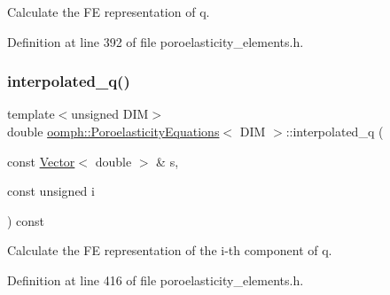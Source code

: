 Calculate the FE representation of q. 



Definition at line 392 of file poroelasticity\+\_\+elements.\+h.

\mbox{\label{classoomph_1_1PoroelasticityEquations_acc0ef084dfaa656827ba4444475df2ba}} 
\subsubsection{\texorpdfstring{interpolated\+\_\+q()}{interpolated\_q()}\hspace{0.1cm}{\footnotesize\ttfamily [2/2]}}
{\footnotesize\ttfamily template$<$unsigned D\+IM$>$ \\
double \hyperlink{classoomph_1_1PoroelasticityEquations}{oomph\+::\+Poroelasticity\+Equations}$<$ D\+IM $>$\+::interpolated\+\_\+q (\begin{DoxyParamCaption}\item[{const \hyperlink{classoomph_1_1Vector}{Vector}$<$ double $>$ \&}]{s,  }\item[{const unsigned}]{i }\end{DoxyParamCaption}) const\hspace{0.3cm}{\ttfamily [inline]}}



Calculate the FE representation of the i-\/th component of q. 



Definition at line 416 of file poroelasticity\+\_\+elements.\+h.

\mbox{\label{classoomph_1_1PoroelasticityEquations_ae6557d385e674865e4a4c01d8a40b9b6}} 
